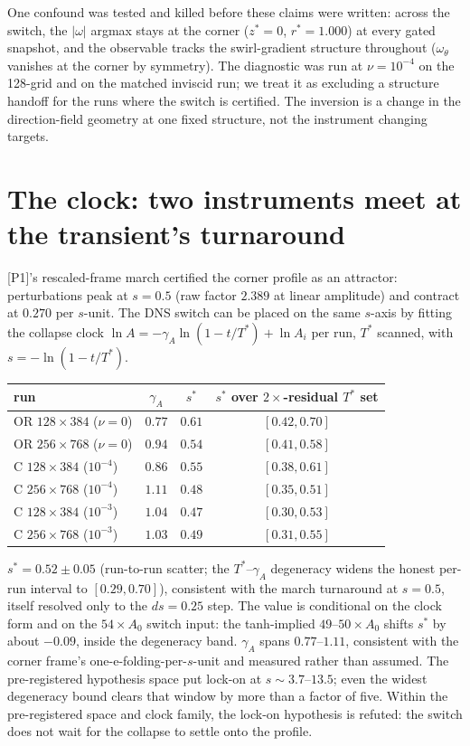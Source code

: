 \documentclass[11pt]{article}
\newcommand{\om}{\omega}
\newcommand{\Anaught}{A_0}
\begin{document}
One confound was tested and killed before these claims were written:
across the switch, the $|\om|$ argmax stays at the corner ($z^{*}=0$,
$r^{*}=1.000$) at every gated snapshot, and the observable tracks the
swirl-gradient structure throughout ($\om_\theta$ vanishes at the
corner by symmetry). The diagnostic was run at $\nu=10^{-4}$ on the
128-grid and on the matched inviscid run; we treat it as excluding a
structure handoff for the runs where the switch is certified. The
inversion is a change in the direction-field geometry at one fixed
structure, not the instrument changing targets.

\section{The clock: two instruments meet at the transient's turnaround}
\label{sec:clock}

[P1]'s rescaled-frame march certified the corner profile as an
attractor: perturbations peak at $s=0.5$ (raw factor $2.389$ at linear
amplitude) and contract at $0.270$ per $s$-unit. The DNS switch can be
placed on the same $s$-axis by fitting the collapse clock
$\ln A=-\gamma_A\ln(1-t/T^{*})+\ln A_i$ per run, $T^{*}$ scanned, with
$s=-\ln(1-t/T^{*})$.

\begin{center}
\begin{tabular}{lccc}
\toprule
run & $\gamma_A$ & $s^{*}$ & $s^{*}$ over $2\times$-residual $T^{*}$ set \\
\midrule
OR $128\times384$ ($\nu=0$) & $0.77$ & $0.61$ & $[0.42, 0.70]$ \\
OR $256\times768$ ($\nu=0$) & $0.94$ & $0.54$ & $[0.41, 0.58]$ \\
C $128\times384$ ($10^{-4}$) & $0.86$ & $0.55$ & $[0.38, 0.61]$ \\
C $256\times768$ ($10^{-4}$) & $1.11$ & $0.48$ & $[0.35, 0.51]$ \\
C $128\times384$ ($10^{-3}$) & $1.04$ & $0.47$ & $[0.30, 0.53]$ \\
C $256\times768$ ($10^{-3}$) & $1.03$ & $0.49$ & $[0.31, 0.55]$ \\
\bottomrule
\end{tabular}
\end{center}

$s^{*}=0.52\pm0.05$ (run-to-run scatter; the $T^{*}$--$\gamma_A$
degeneracy widens the honest per-run interval to $[0.29,0.70]$),
consistent with the march turnaround at $s=0.5$, itself resolved only
to the $ds=0.25$ step. The value is conditional on the clock form and
on the $54\times\Anaught$ switch input: the tanh-implied
$49$--$50\times\Anaught$ shifts $s^{*}$ by about $-0.09$, inside the
degeneracy band. $\gamma_A$ spans $0.77$--$1.11$, consistent with the
corner frame's one-e-folding-per-$s$-unit and measured rather than
assumed. The pre-registered hypothesis space put lock-on at
$s\sim3.7$--$13.5$; even the widest degeneracy bound clears that window
by more than a factor of five. Within the pre-registered space and
clock family, the lock-on hypothesis is refuted: the switch does not
wait for the collapse to settle onto the profile.
\end{document}

